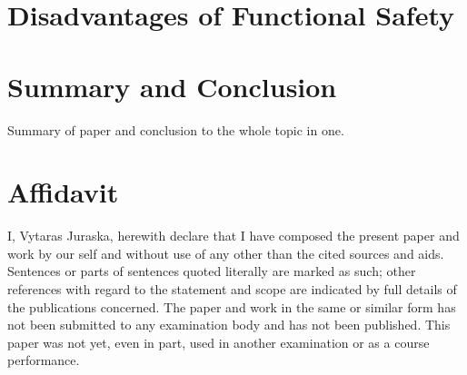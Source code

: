 \documentclass[conference]{IEEEtran}
\begin{document}
\section{Disadvantages of Functional Safety}

\section{Summary and Conclusion}

    Summary of paper and conclusion to the whole topic in one.

\section{Affidavit}
I, Vytaras Juraska, herewith declare that I have composed the present paper and work by our self and without use of any other than the cited sources and aids. Sentences or parts of sentences quoted literally are marked as such; other references with regard to the statement and scope are indicated by full details of the publications concerned. The paper and work in the same or similar form has not been submitted to any examination body and has not been published. This paper was not yet, even in part, used in another examination or as a course performance.


\end{document}
